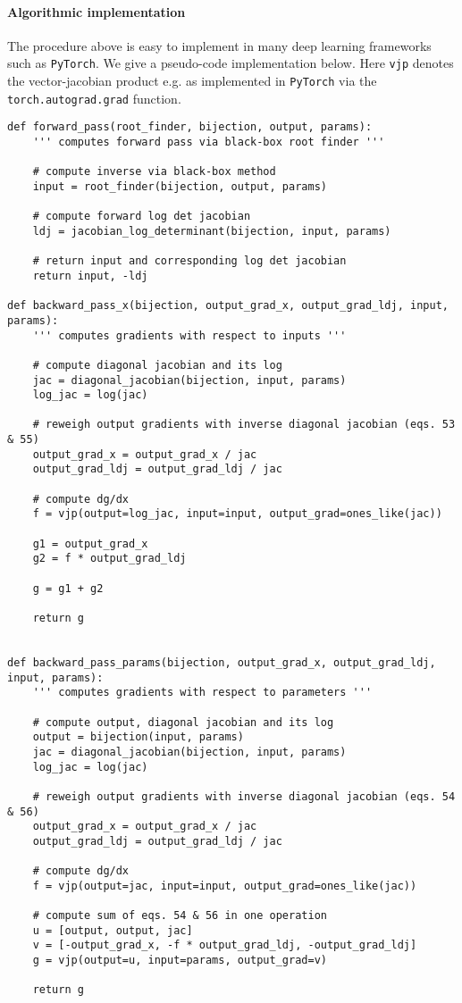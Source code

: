 \documentclass{article}
\begin{document}
\paragraph{Algorithmic implementation}
The procedure above is easy to implement in many deep learning frameworks such as \texttt{PyTorch}. We give a pseudo-code implementation below. Here \texttt{vjp} denotes the vector-jacobian product e.g. as implemented in \texttt{PyTorch} via the \texttt{torch.autograd.grad} function.
\begin{verbatim}
def forward_pass(root_finder, bijection, output, params):
    ''' computes forward pass via black-box root finder '''
    
    # compute inverse via black-box method
    input = root_finder(bijection, output, params)
        
    # compute forward log det jacobian
    ldj = jacobian_log_determinant(bijection, input, params)
    
    # return input and corresponding log det jacobian
    return input, -ldj

def backward_pass_x(bijection, output_grad_x, output_grad_ldj, input, params):
    ''' computes gradients with respect to inputs '''
    
    # compute diagonal jacobian and its log
    jac = diagonal_jacobian(bijection, input, params)
    log_jac = log(jac)
    
    # reweigh output gradients with inverse diagonal jacobian (eqs. 53 & 55)
    output_grad_x = output_grad_x / jac
    output_grad_ldj = output_grad_ldj / jac
    
    # compute dg/dx
    f = vjp(output=log_jac, input=input, output_grad=ones_like(jac))
    
    g1 = output_grad_x
    g2 = f * output_grad_ldj
    
    g = g1 + g2
    
    return g
    
    
def backward_pass_params(bijection, output_grad_x, output_grad_ldj, input, params): 
    ''' computes gradients with respect to parameters '''
    
    # compute output, diagonal jacobian and its log
    output = bijection(input, params)
    jac = diagonal_jacobian(bijection, input, params)
    log_jac = log(jac)
    
    # reweigh output gradients with inverse diagonal jacobian (eqs. 54 & 56)
    output_grad_x = output_grad_x / jac
    output_grad_ldj = output_grad_ldj / jac
    
    # compute dg/dx
    f = vjp(output=jac, input=input, output_grad=ones_like(jac))
    
    # compute sum of eqs. 54 & 56 in one operation
    u = [output, output, jac]
    v = [-output_grad_x, -f * output_grad_ldj, -output_grad_ldj]
    g = vjp(output=u, input=params, output_grad=v)
    
    return g
\end{verbatim}
\end{document}
